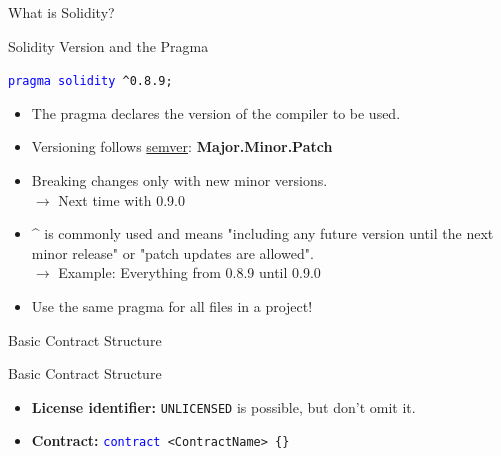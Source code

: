 \documentclass[handout]{beamer}
\begin{document}
\begin{frame}{What is Solidity?}
\vspace{1em}
	

\end{frame}


\begin{frame}{Solidity Version and the Pragma}

	\texttt{\textcolor{blue}{pragma solidity} \^{}0.8.9;}
\vspace{1em}
	\begin{itemize}
		\item<1-> The pragma declares the version of the compiler to be used.
 		\item<2-> Versioning follows \link \href{https://semver.org/}{semver}: \textbf{Major.Minor.Patch}
 		\item<3-> Breaking changes only with new minor versions. \\ {\small $\rightarrow$ Next time with 0.9.0}
		\item<4->  \^{} is commonly used and means "including any future version until the next minor release" or "patch updates are allowed". \\
 {$\rightarrow$ \small Example: Everything from 0.8.9 until 0.9.0}
 		\item<5-> Use the same pragma for all files in a project!
	\end{itemize}
	
\end{frame}


\begin{frame}{Basic Contract Structure}

	\begin{samplecode}{Basic Contract Structure}
		
	\end{samplecode}
	\begin{itemize}
		\item \textbf{License identifier:} \texttt{UNLICENSED} is possible, but don't omit it.
		\item \textbf{Contract:} \texttt{\textcolor{blue}{contract} <ContractName> \{\}}
	\end{itemize}

\end{frame}
\end{document}
